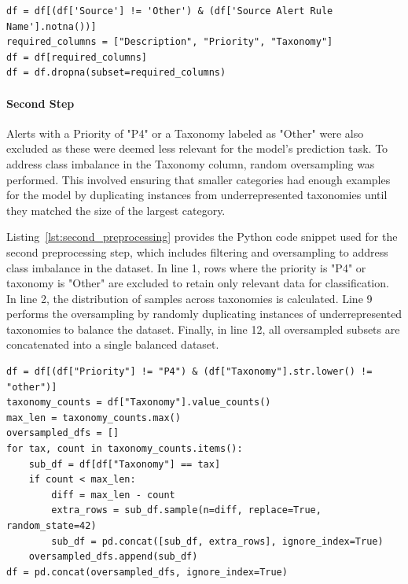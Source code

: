 \vspace{0.2cm}
\noindent
\begin{minipage}{\linewidth}
\begin{verbatim}
df = df[(df['Source'] != 'Other') & (df['Source Alert Rule Name'].notna())]
required_columns = ["Description", "Priority", "Taxonomy"]
df = df[required_columns]
df = df.dropna(subset=required_columns)
\end{verbatim}
\label{lst:first_preprocessing}
\end{minipage}
\vspace{0.1cm}

\paragraph{Second Step}
Alerts with a Priority of "P4" or a Taxonomy labeled as "Other" were also excluded as these were deemed less relevant for the model's prediction task. 
To address class imbalance in the Taxonomy column, random oversampling was performed. 
This involved ensuring that smaller categories had enough examples for the model by duplicating instances from underrepresented taxonomies until they matched the size of the largest category.

Listing~\ref{lst:second_preprocessing} provides the Python code snippet used for the second preprocessing step, which includes filtering and oversampling to address class imbalance in the dataset. 
In line 1, rows where the priority is "P4" or taxonomy is "Other" are excluded to retain only relevant data for classification. 
In line 2, the distribution of samples across taxonomies is calculated. 
Line 9 performs the oversampling by randomly duplicating instances of underrepresented taxonomies to balance the dataset. 
Finally, in line 12, all oversampled subsets are concatenated into a single balanced dataset.

\vspace{0.2cm}
\noindent
\begin{minipage}{\linewidth}
\begin{verbatim}
df = df[(df["Priority"] != "P4") & (df["Taxonomy"].str.lower() != "other")]
taxonomy_counts = df["Taxonomy"].value_counts()
max_len = taxonomy_counts.max()
oversampled_dfs = []
for tax, count in taxonomy_counts.items():
    sub_df = df[df["Taxonomy"] == tax]
    if count < max_len:
        diff = max_len - count
        extra_rows = sub_df.sample(n=diff, replace=True, random_state=42)
        sub_df = pd.concat([sub_df, extra_rows], ignore_index=True)
    oversampled_dfs.append(sub_df)
df = pd.concat(oversampled_dfs, ignore_index=True)
\end{verbatim}
\label{lst:second_preprocessing}
\end{minipage}
\vspace{0.1cm}

